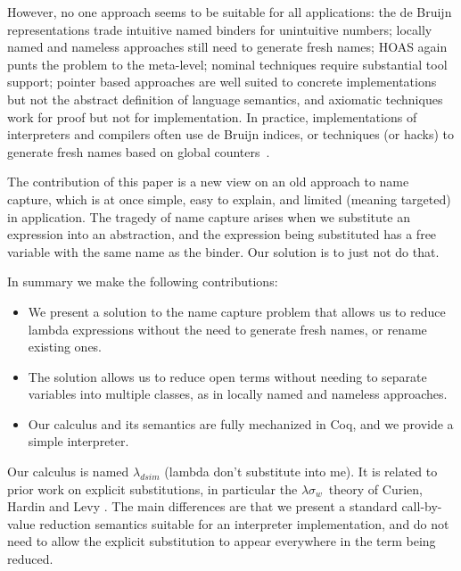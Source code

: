 However, no one approach seems to be suitable for all applications: the de Bruijn representations trade intuitive named binders for unintuitive numbers; locally named and nameless approaches still need to generate fresh names; HOAS again punts the problem to the meta-level; nominal techniques require substantial tool support; pointer based approaches are well suited to concrete implementations but not the abstract definition of language semantics, and axiomatic techniques work for proof but not for implementation. In practice, implementations of interpreters and compilers often use de Bruijn indices, or techniques (or hacks) to generate fresh names based on global counters~\cite{Augustsson:names}.

The contribution of this paper is a new view on an old approach to name capture, which is at once simple, easy to explain, and limited (meaning targeted) in application. The tragedy of name capture arises when we substitute an expression into an abstraction, and the expression being substituted has a free variable with the same name as the binder. Our solution is to just not do that. 

In summary we make the following contributions:
%
\begin{itemize}
\item   We present a solution to the name capture problem that allows us to reduce lambda expressions without the need to generate fresh names, or rename existing ones.

\item   The solution allows us to reduce open terms without needing to separate variables into multiple classes, as in locally named and nameless approaches.

\item   Our calculus and its semantics are fully mechanized in Coq, and we provide a simple interpreter.
\end{itemize}

Our calculus is named $\lambda_{dsim}$ (lambda don't substitute into me). It is related to prior work on explicit substitutions, in particular the 
\mbox{$\lambda\sigma_w$ theory} of Curien, Hardin and Levy \cite{Curien:explicit-substitutions}. The main differences are that we present a standard call-by-value reduction semantics suitable for an interpreter implementation, and do not need to allow the explicit substitution to appear everywhere in the term being reduced.


